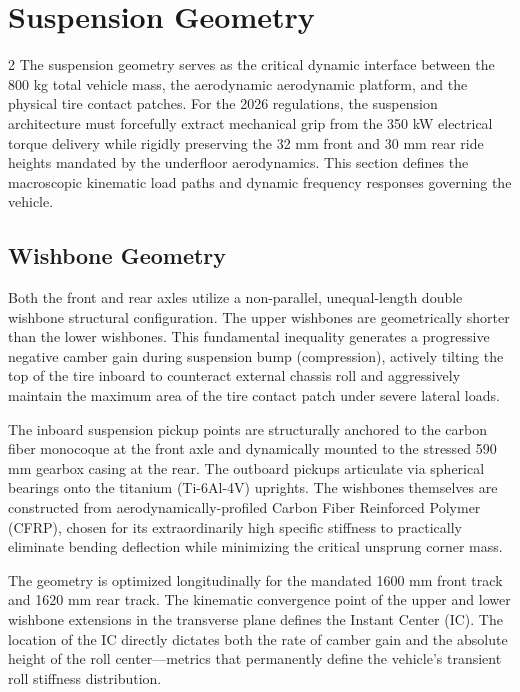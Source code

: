 \section{Suspension Geometry}

\begin{multicols}{2}
The suspension geometry serves as the critical dynamic interface between the 800 kg total vehicle mass, the aerodynamic aerodynamic platform, and the physical tire contact patches. For the 2026 regulations, the suspension architecture must forcefully extract mechanical grip from the 350 kW electrical torque delivery while rigidly preserving the 32 mm front and 30 mm rear ride heights mandated by the underfloor aerodynamics. This section defines the macroscopic kinematic load paths and dynamic frequency responses governing the vehicle.

\subsection{Wishbone Geometry}

Both the front and rear axles utilize a non-parallel, unequal-length double wishbone structural configuration. The upper wishbones are geometrically shorter than the lower wishbones. This fundamental inequality generates a progressive negative camber gain during suspension bump (compression), actively tilting the top of the tire inboard to counteract external chassis roll and aggressively maintain the maximum area of the tire contact patch under severe lateral loads.

The inboard suspension pickup points are structurally anchored to the carbon fiber monocoque at the front axle and dynamically mounted to the stressed 590 mm gearbox casing at the rear. The outboard pickups articulate via spherical bearings onto the titanium (Ti-6Al-4V) uprights. The wishbones themselves are constructed from aerodynamically-profiled Carbon Fiber Reinforced Polymer (CFRP), chosen for its extraordinarily high specific stiffness to practically eliminate bending deflection while minimizing the critical unsprung corner mass. 

The geometry is optimized longitudinally for the mandated 1600 mm front track and 1620 mm rear track. The kinematic convergence point of the upper and lower wishbone extensions in the transverse plane defines the Instant Center (IC). The location of the IC directly dictates both the rate of camber gain and the absolute height of the roll center—metrics that permanently define the vehicle's transient roll stiffness distribution.


\end{multicols}
